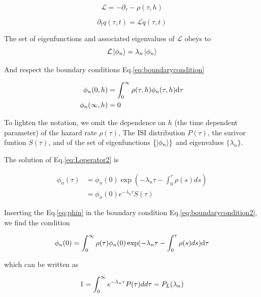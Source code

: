 \documentclass[12pt,twoside]{report}
\def \dd  {{\rm d}}
\begin{document}
\begin{equation}
\label{eq:Loperator}
\mathcal{L}=-\partial_\tau-\rho(\tau,h)
\end{equation}

\begin{equation}
\label{eq:masterequation2}
\partial_t q(\tau,t)=\mathcal{L}q(\tau,t)
\end{equation}

The set of eigenfunctions and associated eigenvalues of $\mathcal{L}$ obeys to
\begin{equation}
\label{eq:Loperator2}
\mathcal{L}\ket{\phi_n}=\lambda_n\ket{\phi_n}
\end{equation}

And respect the boundary conditions Eq.\eqref{eq:boundarycondition}

\begin{align}
\label{eq:boundarycondition2}
\phi_n(0,h)&=\int_0^\infty\rho(\tau,h)\phi_n(\tau,h)\dd\tau\\
\phi_n(\infty,h)&=0\\
\end{align}


To lighten the notation, we omit the dependence on $h$ (the time dependent parameter) of the hazard rate $\rho(\tau)$, The ISI distribution $P(\tau)$, the surivor funtion $S(\tau)$, and of the set of eigenfunctions $\{\ket{\phi_n}\}$ and eigenvalues $\{\lambda_n\}$.

The solution of Eq.\eqref{eq:Loperator2} is

\begin{align}
\label{eq:phin}
\phi_n(\tau)&=\phi_n(0)\exp(-\lambda_n\tau-\int_0^\tau\rho(s)ds)\nonumber\\
&=\phi_n(0)e^{-\lambda_n\tau}S(\tau)
\end{align}

Inserting the Eq.\eqref{eq:phin} in the boundary condition Eq.\eqref{eq:boundarycondition2}, we find the condition

\begin{equation}
\label{eq:condition1}
\phi_n(0)=\int_0^\infty\rho(\tau)\phi_n(0)\exp(-\lambda_n\tau-\int_0^\tau\rho(s)ds)\dd\tau
\end{equation}

which can be written as

\begin{equation}
\label{eq:condition2}
1=\int_0^\infty e^{-\lambda_n \tau}P(\tau)dd\tau=P_L(\lambda_n)\\
\end{equation}
\end{document}
